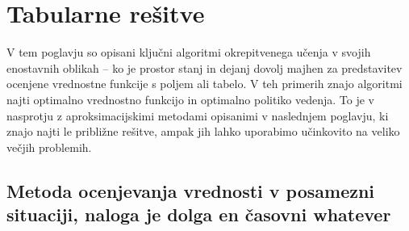 \documentclass[a4paper, oneside, 12pt]{report}
\begin{document}
\chapter{Tabularne rešitve}
\thispagestyle{fancy}
V tem poglavju so opisani ključni algoritmi okrepitvenega učenja v svojih enostavnih oblikah -- ko je prostor stanj in dejanj dovolj majhen za predstavitev ocenjene vrednostne funkcije s poljem ali tabelo. V teh primerih znajo algoritmi najti optimalno vrednostno funkcijo in optimalno politiko vedenja. To je v nasprotju z aproksimacijskimi metodami opisanimi v naslednjem poglavju, ki znajo najti le približne rešitve, ampak jih lahko uporabimo učinkovito na veliko večjih problemih.

\section{Metoda ocenjevanja vrednosti v posamezni situaciji, naloga je dolga en časovni whatever}
\end{document}
